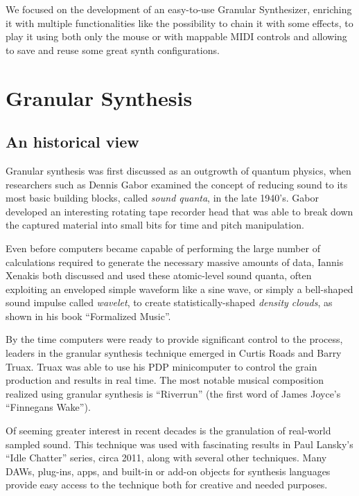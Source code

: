 \documentclass[12pt, a4paper]{article}
\newcommand{\quotes}[1]{``#1''}
\begin{document}
We focused on the development of an easy-to-use Granular Synthesizer, enriching it with multiple functionalities like the possibility to chain it with some effects, to play it using both only the mouse or with mappable MIDI controls and allowing to save and reuse some great synth configurations. 

\section{Granular Synthesis}
\subsection{An historical view}
Granular synthesis was first discussed as an outgrowth of quantum physics, when researchers such as Dennis Gabor examined the concept of reducing sound to its most basic building blocks, called \emph{sound quanta}, in the late 1940's. \newline
Gabor developed an interesting rotating tape recorder head that was able to break down the captured material into small bits for time and pitch manipulation. 

Even before computers became capable of performing the large number of calculations required to generate the necessary massive amounts of data, Iannis Xenakis both discussed and used these atomic-level sound quanta, often exploiting an enveloped simple waveform like a sine wave, or simply a bell-shaped sound impulse called \emph{wavelet}, to create statistically-shaped \emph{density clouds}, as shown in his book \quotes{Formalized Music}. 

By the time computers were ready to provide significant control to the process, leaders in the granular synthesis technique emerged in Curtis Roads and Barry Truax.
Truax was able to use his PDP minicomputer to control the grain production and results in real time. \newline The most notable musical composition realized using granular synthesis is \quotes{Riverrun} (the first word of James Joyce's \quotes{Finnegans Wake}). %

Of seeming greater interest in recent decades is the granulation of real-world sampled sound. This technique was used with fascinating results in Paul Lansky's \quotes{Idle Chatter} series, circa 2011, along with several other techniques. Many DAWs, plug-ins, apps, and built-in or add-on objects for synthesis languages provide easy access to the technique both for creative and needed purposes. 
\end{document}
